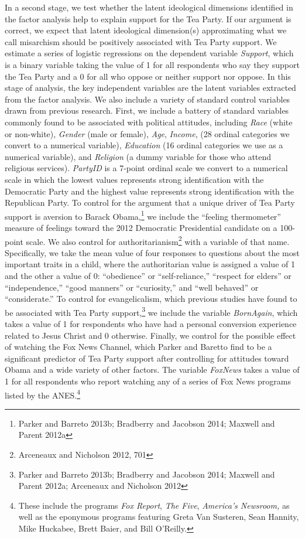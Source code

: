\documentclass[12pt,]{article}
\begin{document}
In a second stage, we test whether the latent ideological dimensions
identified in the factor analysis help to explain support for the Tea
Party. If our argument is correct, we expect that latent ideological
dimension(s) approximating what we call misarchism should be positively
associated with Tea Party support. We estimate a series of logistic
regressions on the dependent variable \emph{Support}, which is a binary
variable taking the value of 1 for all respondents who say they support
the Tea Party and a 0 for all who oppose or neither support nor oppose.
In this stage of analysis, the key independent variables are the latent
variables extracted from the factor analysis. We also include a variety
of standard control variables drawn from previous research. First, we
include a battery of standard variables commonly found to be associated
with political attitudes, including \emph{Race} (white or non-white),
\emph{Gender} (male or female), \emph{Age}, \emph{Income}, (28 ordinal
categories we convert to a numerical variable), \emph{Education} (16
ordinal categories we use as a numerical variable), and \emph{Religion}
(a dummy variable for those who attend religious services).
\emph{PartyID} is a 7-point ordinal scale we convert to a numerical
scale in which the lowest values represents strong identification with
the Democratic Party and the highest value represents strong
identification with the Republican Party. To control for the argument
that a unique driver of Tea Party support is aversion to Barack
Obama,\footnote{Parker and Barreto 2013b; Bradberry and Jacobson 2014;
  Maxwell and Parent 2012a} we include the ``feeling thermometer''
measure of feelings toward the 2012 Democratic Presidential candidate on
a 100-point scale. We also control for authoritarianism\footnote{Arceneaux
  and Nicholson 2012, 701} with a variable of that name. Specifically,
we take the mean value of four responses to questions about the most
important traits in a child, where the authoritarian value is assigned a
value of 1 and the other a value of 0: ``obedience'' or
``self-reliance,'' ``respect for elders'' or ``independence,'' ``good
manners'' or ``curiosity,'' and ``well behaved'' or ``considerate.'' To
control for evangelicalism, which previous studies have found to be
associated with Tea Party support,\footnote{Parker and Barreto 2013b;
  Bradberry and Jacobson 2014; Maxwell and Parent 2012a; Arceneaux and
  Nicholson 2012} we include the variable \emph{BornAgain}, which takes
a value of 1 for respondents who have had a personal conversion
experience related to Jesus Christ and 0 otherwise. Finally, we control
for the possible effect of watching the Fox News Channel, which Parker
and Baretto find to be a significant predictor of Tea Party support
after controlling for attitudes toward Obama and a wide variety of other
factors. The variable \emph{FoxNews} takes a value of 1 for all
respondents who report watching any of a series of Fox News programs
listed by the ANES.\footnote{These include the programs \emph{Fox
  Report}, \emph{The Five}, \emph{America's Newsroom,} as well as the
  eponymous programs featuring Greta Van Susteren, Sean Hannity, Mike
  Huckabee, Brett Baier, and Bill O'Reilly.}
\end{document}
